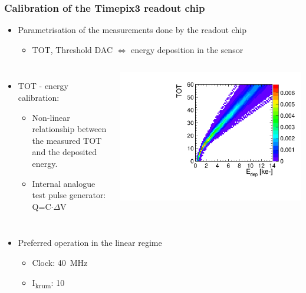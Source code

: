 \begin{frame}
  \frametitle{Calibration of the Timepix3 readout chip}

  \begin{itemize}
  \item Parametrisation of the measurements done by the readout chip
    \begin{itemize}
    \item TOT, Threshold DAC $\Longleftrightarrow$ energy deposition in the sensor
    \end{itemize}
  \end{itemize}

  \begin{columns}
    \begin{itemize}
    \item TOT - energy calibration:
      \begin{itemize}
      \item Non-linear relationship between the measured TOT and the
        deposited energy.
      \item Internal analogue test pulse generator: \\
        Q=C$\cdot \Delta$V
      \end{itemize}
    \end{itemize}

    \centering
    \includegraphics[width=\textwidth]{../figures/Calibration/TOTcalibration_W0005_E02_thresh1160.pdf}
  \end{columns}

  \begin{itemize}
  \item Preferred operation in the linear regime
    \begin{itemize}
    \item Clock: 40~MHz
    \item I\textsubscript{krum}: 10
    \end{itemize}
  \end{itemize}
\end{frame}


